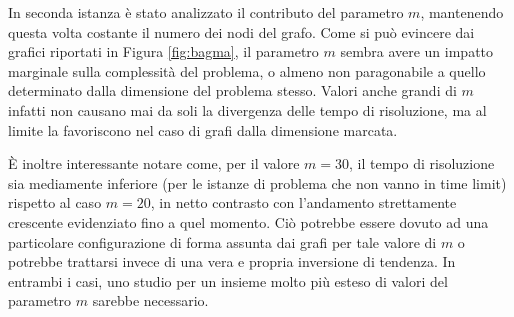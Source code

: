 In seconda istanza è stato analizzato il contributo del parametro $m$, mantenendo questa volta costante il numero dei nodi del grafo. Come si può evincere dai grafici riportati in Figura \ref{fig:bagma}, il parametro $m$ sembra avere un impatto marginale sulla complessità del problema, o almeno non paragonabile a quello determinato dalla dimensione del problema stesso. Valori anche grandi di $m$ infatti non causano mai da soli la divergenza delle tempo di risoluzione, ma al limite la favoriscono nel caso di grafi dalla dimensione marcata. 

È inoltre interessante notare come, per il valore $m=30$, il tempo di risoluzione sia mediamente inferiore (per le istanze di problema che non vanno in time limit) rispetto al caso $m=20$, in netto contrasto con l'andamento strettamente crescente evidenziato fino a quel momento. Ciò potrebbe essere dovuto ad una particolare configurazione di forma assunta dai grafi per tale valore di $m$ o potrebbe trattarsi invece di una vera e propria inversione di tendenza. In entrambi i casi, uno studio per un insieme molto più esteso di valori del parametro $m$ sarebbe necessario.

